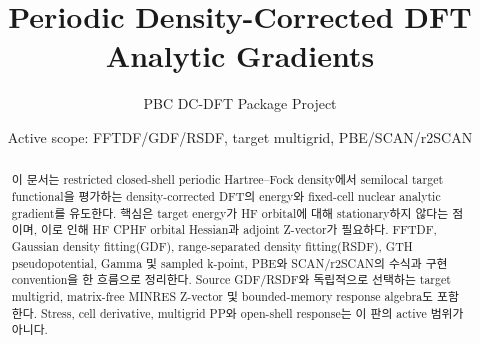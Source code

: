 \documentclass[11pt,a4paper]{article}
\title{Periodic Density-Corrected DFT Analytic Gradients}
\author{PBC DC-DFT Package Project}
\date{Active scope: FFTDF/GDF/RSDF, target multigrid, PBE/SCAN/r2SCAN}
\theoremstyle{definition}
\begin{document}
\maketitle
\begin{abstract}
이 문서는 restricted closed-shell periodic Hartree--Fock density에서 semilocal target
functional을 평가하는 density-corrected DFT의 energy와 fixed-cell nuclear analytic
gradient를 유도한다. 핵심은 target energy가 HF orbital에 대해 stationary하지 않다는
점이며, 이로 인해 HF CPHF orbital Hessian과 adjoint Z-vector가 필요하다. FFTDF,
Gaussian density fitting(GDF), range-separated density fitting(RSDF), GTH
pseudopotential, Gamma 및 sampled k-point, PBE와 SCAN/r2SCAN의 수식과 구현 convention을
한 흐름으로 정리한다. Source GDF/RSDF와 독립적으로 선택하는 target multigrid,
matrix-free MINRES Z-vector 및 bounded-memory response algebra도 포함한다. Stress, cell
derivative, multigrid PP와 open-shell response는 이 판의 active 범위가 아니다.
\end{abstract}
\tableofcontents

















\end{document}
